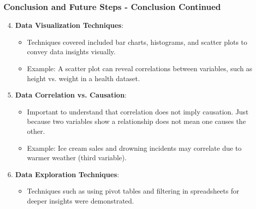 \documentclass[aspectratio=169]{beamer}
\begin{document}
\begin{frame}[fragile]
    \frametitle{Conclusion and Future Steps - Conclusion Continued}
    \begin{enumerate}
        \setcounter{enumi}{3} %
        \item \textbf{Data Visualization Techniques}:
        \begin{itemize}
            \item Techniques covered included bar charts, histograms, and scatter plots to convey data insights visually.
            \item Example: A scatter plot can reveal correlations between variables, such as height vs. weight in a health dataset.
        \end{itemize}

        \item \textbf{Data Correlation vs. Causation}:
        \begin{itemize}
            \item Important to understand that correlation does not imply causation. Just because two variables show a relationship does not mean one causes the other.
            \item Example: Ice cream sales and drowning incidents may correlate due to warmer weather (third variable).
        \end{itemize}

        \item \textbf{Data Exploration Techniques}:
        \begin{itemize}
            \item Techniques such as using pivot tables and filtering in spreadsheets for deeper insights were demonstrated.
        \end{itemize}
    \end{enumerate}
\end{frame}
\end{document}

